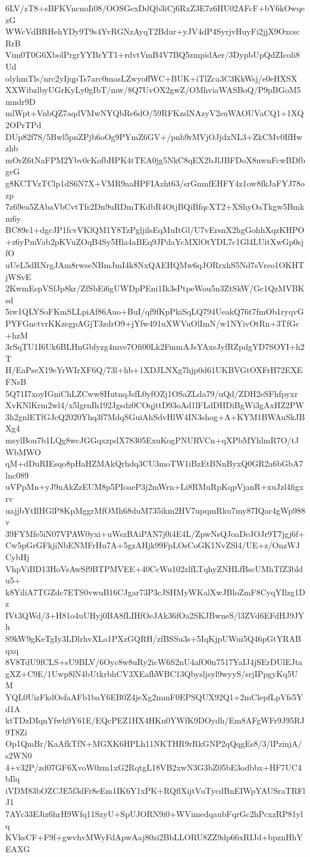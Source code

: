 6LV/zT8+sBFKVncnoIi08/OOSGexDdQb3iCj6RxZ3E7z6HU02AFcF+bY6kOwqezG
WWcVdBRHehYDy9T9s4YvRGNzAyqT2Bdur+yJV4dP4SyrjvHuyFi2jjX9OxcscRrB
Vim0T0G6XbolPrgrYYBrYT1+rdvtVmB4V7BQ5zmpidAer/3DypbUpQdZIcoli8Ud
olyhmTls/nrc2yIjqpTs7arc0masLZwyoffWC+BUK+iTlZca3C3KkWsj/e0eHXSX
XXWibzlbyUGrKyLy0gIbT/mw/8Q7UvOX2gwZ/OMhviaWASBoQ/P9pBGoM5mndr9D
mlWpt+VnbQZ7aqdVMwNYQbRe6dO/59RFKzslNAzyV2suWAOUVaCQ1+1XQ2OPrTPd
DUp82f7S/5Bwl5pnZPjb6oOg9PYmZ6GV+/pnb9rMVjOJjdxNL3+ZkCMv0IfHwzhb
mOrZ6tNaFPM2Ybv0cKofbHPK4tTEA0jg5NkC8qEX2bJlJBFDoX8nwnFcwBDfbgeG
g8KCTVzTClp1dS6N7X+VMR9aaHPFIAzht63/srGnmfEHFY4z1ow8fkJaFYJ78ozp
7z69ea5ZAbaVbCvtTfs2Dn9uRDmTKdbR4OtjBQiBfqcXT2+XShyOaTkgw5Bmkm6y
BC89e1+dgcJP1fcvVKlQM1Y8TzPgljilsEqMuItGl/U7vErsnX2hgGohhXqzKHPO
+z6yPmVab2pKVuZOqB4Sy5Hla4aBEq9JPdaYcMXlOtYDL7c1Gl4LUitXwGp0sjfO
uUeL5dRNrgJAm8rwseNBmJmI4k8NxQAEHQMw6qJORrxhS5Nd7sVreo1OKHTjWSvE
2KwmEspVSfJp8kr/ZfSbEi6gUWDpPEni1Ik3sPtpeWou5n3ZtSkW/Gc1QzMVBKsd
5iw1QLYSoFKmSLLpiAf86Auo+BuI/qf9fKpPkiSqLQ794UeakQ76t7fmOb1ryqvG
PYFGnctvrKKzegpAGjT3zdrO9+jYfw491uXWVuOlImN/w1NYivOtRn+3TfGc+hzM
3rSqTU1I6Uk6BLHnGbfyzg4mve7Ofi00Lk2FmmAJsYAxsJyfRZpdgYD7SOYI+h2T
H/EaPseX19eYrWIrXF6Q/73l+hb+1XDJLNXg7hjp0d61UKBVGtOXFrH72EXEFNsB
5Q71I7xoyIGniChLZCww8HutnqJsfL0yfOZj1OSaZLda79/uQd/ZDH2eSFhfpyxr
XvKNlKrm2wl4/x5lgrnIh192Jgsdz0COqjttD93oAd1lFLdDHDiBgWi3gAxHZ2PW
3h2gnlETfGJcQ2020Yhq3f7MdqSGuiAhSdvHlW4IN3shog+A+KYM1BWAuSkJBXg4
msylBou7b1LQg8wcJGGqxzpdX78305ExuKogPNURVCn+qXPbMYhlmR7O/tJWbMWO
qM+dDuRIEsqo8pHaHZMAkQrhdq3CU3moTW1iBzEtBNnByxQ0GR2a6bGbA7lnc089
uVPpMn+yJ9nAkZzEUM8p5PIoaeP3j2mWrn+Li8RMuRpKqpVjanR+xuJzl4figxrv
uajjbYtIlHGlP8KpMggrMfOMh68duM735ikm2HV7upqmRku7my87IQar4gWp988v
39FYMfe5iN07VPAW0yxi+uWszBAiPAN7j0i4E4L/ZpwNsQJoaDeJOJr9T7jgj6f+
Cw5pGrGFkjiNbENMFrHu7A+5gzAHjk99FpLOsCoGK1NvZSl4/UE+z/OnzWJCybHj
VhpViBD13HoVsAwSf9BTPMVEE+40CcWu102zlfLTqhyZNHLfBscUMhTfZ3bldu5+
k8YiliA7TGZdc7ETS0vwuB16CJgar73P3cJSHMyWKalXwJBloZmF8CyqYIlzg1Dz
IVt3QWd/3+H81o4uUHyj0BA8fLIHfOeJAk36fOa2SKJBwneS/l3ZVd6EFdHJ9JYh
S9kW9gKeTgIy3LDlrhvXLo1PXzGQRH/zfBSSu3s+5IqKjpUWui5Q46pGtYRABqxq
8V8TdU9fCLS+sU9BLV/6Oyc8w8uRy2icW6S2nU4afO0n7517YaIJ4jSErDUlEJta
gXZ+C9E/1Uwp8lN4bUtkrbhCV3XEafhWBC13Qbysljsyl9wyyS/srjIPpgyKq5UM
YQL0UizFkdOsfaAFb1baY6EB0Z4jeXg2mmF0EPSQUX92Q1+2mClepfLpVfs5Yd1A
ktTDzDIqnYfwh9Y61E/EQcPEZ1HX4HKn0YWfK9DOydh/Em8AFgWFr9J95RJ9T8Zi
Op1QmBr/KaAfkTfN+MGXK6HPLh11NKTHR9rRkGNP2qQqgEs8/3/lPzinjA/s2WN0
4+v32P/zd07GF6XvoW0zm1xG2RqtgL18VB2xwN3G3bZ05bE3odbbx+HF7UC4bIlq
iVDM83bOZCJE5f3dFr8eEm1IK6Y1xPK+RQflXijtVuTycdBnEIWpYAUSraTRFlJ1
7AYc33EJiz6hrH9Wfq11SzyU+SpUJORN9i0+WVimedqaubFqrGc2hPcxzRP81ylq
KVksCF+F9f+gwvhvMWyFdApwAaj80zi2BbLLORU8ZZ9dp66xRIJd+bpznHhYEAXG

